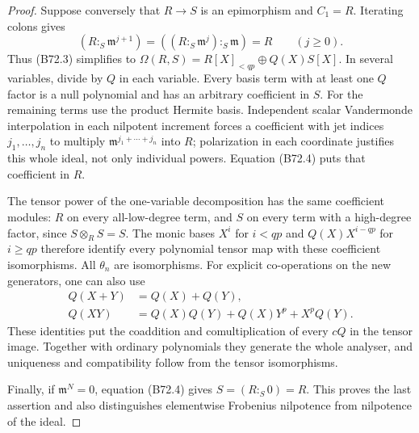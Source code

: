 \begin{proof}
Suppose conversely that $R\to S$ is an epimorphism and $C_1=R$.
Iterating colons gives
\[
 (R:_S\mathfrak m^{j+1})
       =((R:_S\mathfrak m^j):_S\mathfrak m)=R
                         \qquad(j\ge0).                  \tag{B72.4}
\]
Thus (B72.3) simplifies to
$\Omega(R,S)=R[X]_{<qp}\oplus Q(X)S[X]$.
In several variables, divide by $Q$ in each variable. Every basis term
with at least one $Q$ factor is a null polynomial and has an arbitrary
coefficient in $S$. For the remaining terms use the product Hermite basis.
Independent scalar Vandermonde interpolation in each nilpotent increment
forces a coefficient with jet indices $j_1,\ldots,j_n$ to multiply
$\mathfrak m^{j_1+\cdots+j_n}$ into $R$; polarization in each coordinate
justifies this whole ideal, not only individual powers. Equation (B72.4)
puts that coefficient in $R$.

The tensor power of the one-variable decomposition has the same
coefficient modules: $R$ on every all-low-degree term, and $S$ on every
term with a high-degree factor, since $S\otimes_R S=S$.
The monic bases $X^i$ for $i<qp$ and $Q(X)X^{i-qp}$ for $i\ge qp$
therefore identify every polynomial tensor map with these coefficient
isomorphisms. All $\theta_n$ are isomorphisms.
For explicit co-operations on the new generators, one can also use
\[
\begin{aligned}
 Q(X+Y)&=Q(X)+Q(Y),\\
 Q(XY)&=Q(X)Q(Y)+Q(X)Y^p+X^pQ(Y).
\end{aligned}
\]
These identities put the coaddition and comultiplication of every $cQ$
in the tensor image. Together with ordinary polynomials they generate
the whole analyser, and uniqueness and compatibility follow from the
tensor isomorphisms.

Finally, if $\mathfrak m^N=0$, equation (B72.4) gives
$S=(R:_S0)=R$. This proves the last assertion and also distinguishes
elementwise Frobenius nilpotence from nilpotence of the ideal.
\end{proof}

